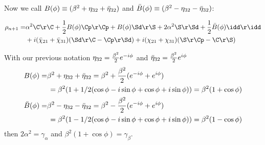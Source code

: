 \begin{imported}
Now we call $B(\phi)\equiv(\beta^2+\eta_{32}+\bar{\eta}_{32})$ and $\bar{B}(\phi)\equiv(\beta^2-\eta_{32}-\bar{\eta}_{32})$:

\begin{align}
    \rho_{n+1} =&
    \a\C\r\C 
    +\frac{1}{2}B(\phi)\Cp\r\Cp
    +B(\phi)\Sd\r\S 
    +2\a\S\r\Sd 
    +\frac{1}{2}\bar{B}(\phi)\idd\r\idd
    \\
    &+i(\chidownone+\chidowntwo)(\Sd\r\C - \Cp\r\Sd)
    +i(\chiupone+\chiuptwo)(\S\r\Cp - \C\r\S)
\end{align}

With our previous notation $\eta_{32} = \frac{\beta^2}{2} e^{-i\phi}$ and $\bar{\eta}_{32} = \frac{\beta^2}{2} e^{i\phi}$
\begin{align}
    B(\phi) =& \beta^2+\eta_{32}+\bar{\eta}_{32} = \beta^2 + \frac{\beta^2}{2} (e^{-i\phi} + e^{i\phi}) \\
    &\,= \beta^2 (1 + 1/2(\cos\phi -i\sin\phi + \cos\phi +i\sin\phi)) = \beta^2(1+\cos\phi) 
    \\
    \bar{B}(\phi) =& \beta^2-\eta_{32}-\bar{\eta}_{32} = \beta^2 - \frac{\beta^2}{2} (e^{-i\phi} + e^{i\phi}) \\
    &\,= \beta^2 (1 - 1/2(\cos\phi -i\sin\phi + \cos\phi +i\sin\phi)) = \beta^2(1 - \cos\phi) 
\end{align}
then $2\alpha^2 = \gamma_\alpha$ and $\beta^2(1+\cos\phi) = \gamma_\beta$.
\\[10pt]


\end{imported}